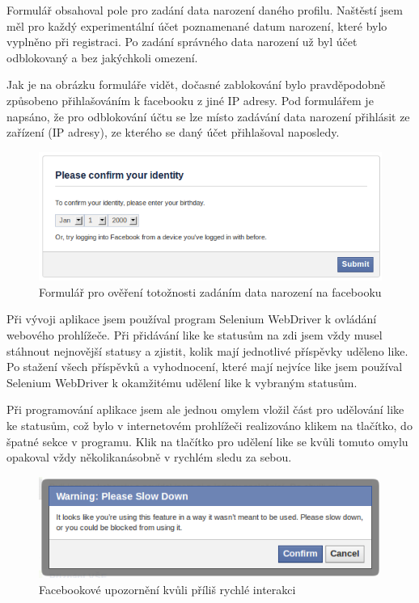 \documentclass[thesis=M,czech]{FITthesis}[2013/05/10]
\begin{document}
Formulář obsahoval pole pro zadání data narození daného profilu. Naštěstí jsem měl pro každý experimentální účet poznamenané datum narození, které bylo vyplněno při registraci. Po zadání správného data narození už byl účet odblokovaný a bez jakýchkoli omezení. 

Jak je na obrázku formuláře vidět, dočasné zablokování bylo pravděpodobně způsobeno přihlašováním k facebooku z jiné IP adresy. Pod formulářem je napsáno, že pro odblokování účtu se lze místo zadávání data narození přihlásit ze zařízení (IP adresy), ze kterého se daný účet přihlašoval naposledy.

\begin{figure}[h]
\begin{center}
\includegraphics[width=5in]{figures/confirmIdentity.png}
\caption{Formulář pro ověření totožnosti zadáním data narození na facebooku}
\label{fig:confirmIdentity}
\end{center}
\end{figure}

Při vývoji aplikace jsem používal program Selenium WebDriver k ovládání webového prohlížeče. Při přidávání like ke statusům na zdi jsem vždy musel stáhnout nejnovější statusy a zjistit, kolik mají jednotlivé příspěvky uděleno like. Po stažení všech příspěvků a vyhodnocení, které mají nejvíce like jsem používal Selenium WebDriver k okamžitému udělení like k vybraným statusům. 

Při programování aplikace jsem ale jednou omylem vložil část pro udělování like ke statusům, což bylo v internetovém prohlížeči realizováno klikem na tlačítko, do špatné sekce v programu. Klik na tlačítko pro udělení like se kvůli tomuto omylu opakoval vždy několikanásobně v rychlém sledu za sebou.

\begin{figure}[h]
\begin{center}
\includegraphics[width=5in]{figures/slowDown.png}
\caption{Facebookové upozornění kvůli příliš rychlé interakci}
\label{fig:slowDown}
\end{center}
\end{figure}
\end{document}
